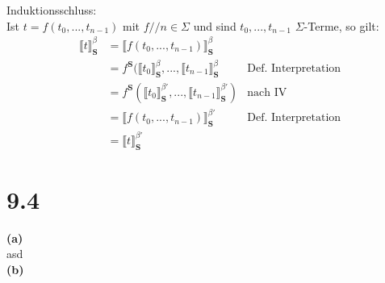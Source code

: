 \documentclass[12pt,a4paper]{scrartcl}
\begin{document}
  Induktionsschluss:\\
  Ist $t = f(t_0, ...,t_{n-1})$ mit $f // n \in \Sigma$ und sind $t_0, ..., t_{n-1}$ $\Sigma$-Terme, so gilt:\\
  \begin{align*}
  \llbracket t \rrbracket^{\beta}_{\textbf{S}} &= \llbracket f(t_0, ...,t_{n-1}) \rrbracket^{\beta}_{\textbf{S}}\\
                                               &= f^{\textbf{S}}(\llbracket t_0 \rrbracket^{\beta}_{\textbf{S}}, ...,\llbracket t_{n-1} \rrbracket^{\beta}_{\textbf{S}} &\text{Def. Interpretation}\\
                                               &= f^{\textbf{S}}(\llbracket t_0 \rrbracket^{\beta'}_{\textbf{S}}, ...,\llbracket t_{n-1} \rrbracket^{\beta'}_{\textbf{S}}) &\text{nach IV}\\
                                               &= \llbracket f(t_0, ...,t_{n-1}) \rrbracket^{\beta'}_{\textbf{S}} &\text{Def. Interpretation}\\
                                               &= \llbracket t\rrbracket^{\beta'}_{\textbf{S}}
  \end{align*}  
  \section*{9.4}
  \noindent
  \textbf{(a)}\\
  
  asd\\
  \textbf{(b)}\\
\end{document}
